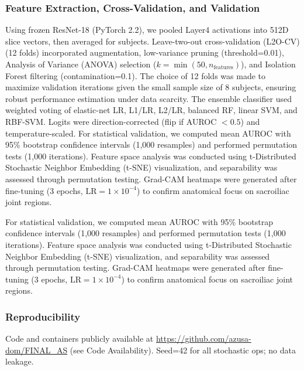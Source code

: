 \documentclass[12pt, a4paper]{article}
\begin{document}
\subsubsection{Feature Extraction, Cross-Validation, and Validation}
Using frozen ResNet-18 (PyTorch 2.2), we pooled Layer4 activations into 512D slice vectors, then averaged for subjects. Leave-two-out cross-validation (L2O-CV) (12 folds) incorporated augmentation, low-variance pruning (threshold=0.01), Analysis of Variance (ANOVA) selection ($k=\min(50, n_\text{features})$), and Isolation Forest filtering (contamination=0.1). The choice of 12 folds was made to maximize validation iterations given the small sample size of 8 subjects, ensuring robust performance estimation under data scarcity. The ensemble classifier used weighted voting of elastic-net LR, L1/LR, L2/LR, balanced RF, linear SVM, and RBF-SVM. Logits were direction-corrected (flip if AUROC $<0.5$) and temperature-scaled. For statistical validation, we computed mean AUROC with 95\% bootstrap confidence intervals (1,000 resamples) and performed permutation tests (1,000 iterations). Feature space analysis was conducted using t-Distributed Stochastic Neighbor Embedding (t-SNE) visualization, and separability was assessed through permutation testing. Grad-CAM heatmaps were generated after fine-tuning (3 epochs, $\mathrm{LR}=1\times10^{-4}$) to confirm anatomical focus on sacroiliac joint regions.


For statistical validation, we computed mean AUROC with 95\% bootstrap confidence intervals (1,000 resamples) and performed permutation tests (1,000 iterations). Feature space analysis was conducted using t-Distributed Stochastic Neighbor Embedding (t-SNE) visualization, and separability was assessed through permutation testing. Grad-CAM heatmaps were generated after fine-tuning (3 epochs, $\mathrm{LR}=1\times 10^{-4}$) to confirm anatomical focus on sacroiliac joint regions.

\subsubsection{Reproducibility}
Code and containers publicly available at \url{https://github.com/azusa-dom/FINAL_AS} (see Code Availability). Seed=42 for all stochastic ops; no data leakage.
\end{document}
